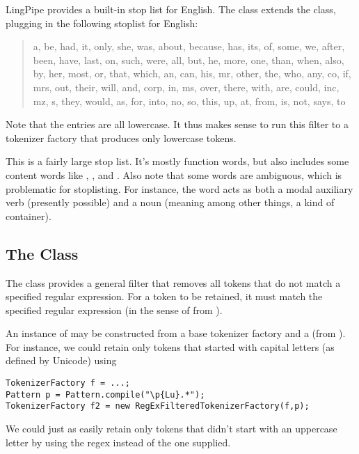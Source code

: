 LingPipe provides a built-in stop list for English.  The
 class extends the
 class, plugging in the following
stoplist for English:
%
\begin{quote}
a, be, had, it, only, she, was, about, because, has, its, of, some,
we, after, been, have, last, on, such, were, all, but, he, more, one,
than, when, also, by, her, most, or, that, which, an, can, his, mr,
other, the, who, any, co, if, mrs, out, their, will, and, corp, in,
ms, over, there, with, are, could, inc, mz, s, they, would, as, for,
into, no, so, this, up, at, from, is, not, says, to
\end{quote}
%
Note that the entries are all lowercase.  It thus makes sense
to run this filter to a tokenizer factory that produces only
lowercase tokens.  

This is a fairly large stop list.  It's mostly function words, but
also includes some content words like ,
, and .  Also note that
some words are ambiguous, which is problematic for stoplisting.  For
instance, the word  acts as both a modal auxiliary
verb (presently possible) and a noun (meaning among other things, a
kind of container).


\subsection{The  Class}

The  class provides a general
filter that removes all tokens that do not match a specified regular
expression.  For a token to be retained, it must match the specified
regular expression (in the sense of  from
).

An instance of  may be constructed
from a base tokenizer factory and a  (from
).  For instance, we could retain only tokens
that started with capital letters (as defined by Unicode) using
%
\begin{verbatim}
TokenizerFactory f = ...;
Pattern p = Pattern.compile("\p{Lu}.*");
TokenizerFactory f2 = new RegExFilteredTokenizerFactory(f,p);
\end{verbatim}
%
We could just as easily retain only tokens that didn't start with an
uppercase letter by using the regex  instead
of the one supplied.


